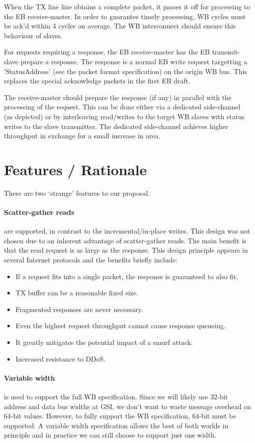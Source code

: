 \documentclass{article}
\begin{document}
When the TX line line obtains a complete packet,
it passes it off for processing to the EB receive-master.
In order to guarantee timely processing,
WB cycles must be ack'd within 4 cycles on average.
The WB interconnect should ensure this behaviour of slaves.

For requests requiring a response,
the EB receive-master has the EB transmit-slave prepare a response.
The response is a normal EB write request targetting a 'StatusAddress'
(see the packet format specification) on the origin WB bus.
This replaces the special acknowledge packets in the first EB draft.

The receive-master should prepare the response (if any) in parallel
with the processing of the request.
This can be done either via a dedicated side-channel (as depicted)
or by interleaving read/writes 
to the target WB slaves with status writes to the slave transmitter.
The dedicated side-channel achieves higher throughput 
in exchange for a small increase in area.

\section{Features / Rationale}

There are two `strange' features to our proposal.

\paragraph{Scatter-gather reads} are supported, in contrast to
the incremental/in-place writes.
This design was not chosen due to an inherent advantage of scatter-gather
reads.
The main benefit is that the read request is as large as the response.
This design principle appears in several Internet protocols and 
the benefits briefly include:
\begin{itemize}
\item If a request fits into a single packet, the response is guaranteed to
also fit.
\item TX buffer can be a reasonable fixed size.
\item Fragmented responses are never necessary.
\item Even the highest request throughput cannot cause response queueing.
\item It greatly mitigates the potential impact of a smurf attack.
\item Increased resistance to DDoS.
\end{itemize}

\paragraph{Variable width} is used to support the full WB specification.
Since we will likely use 32-bit address and data bus widths at GSI,
we don't want to waste message overhead on 64-bit values.
However, to fully support the WB specification, 64-bit must be supported.
A variable width specification allows the best of both worlds in principle
and in practice we can still choose to support just one width.
\end{document}
